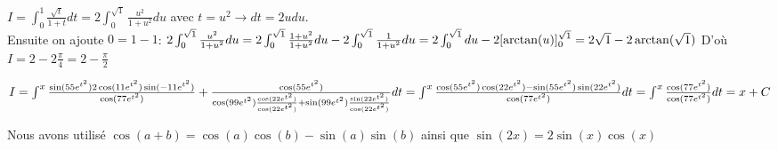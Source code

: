 \documentclass[11.5pt,french,table]{article}
\theoremstyle{exercice}
\newenvironment{packed_enum}{
\begin{enumerate}
  \setlength{\itemsep}{11pt}
  \setlength{\parskip}{0pt}
  \setlength{\parsep}{0pt}
}{\end{enumerate}}
\begin{document}
\begin{packed_enum}
    \item $
    I = \int_{0}^{1} \frac{\sqrt{t}}{1+t}dt = 2\int_{0}^{\sqrt{1}} \frac{u^2}{1+u^2}du
    $ avec $t = u^2 \rightarrow dt = 2udu$. \\Ensuite on ajoute $0 = 1 - 1$:
    $
    2\int_{0}^{\sqrt{1}} \frac{u^2}{1+u^2}du\\ = 2\int_{0}^{\sqrt{1}} \frac{1+u^2}{1+u^2}du - 2\int_{0}^{\sqrt{1}} \frac{1}{1+u^2} du \\= 2\int_{0}^{\sqrt{1}} du - 2[\arctan(u)]_{0}^{\sqrt{1}} \\= 2\sqrt{1}-2\arctan(\sqrt{1})\\
    $ D'où $I = 2 - 2\frac{\pi}{4} = 2 - \frac{\pi}{2}$ 

    \item $
    I = \int_{}^{x} \frac{\sin(55e^{t^{2}})2\cos(11e^{t^{2}})\sin(-11e^{t^{2}})}{\cos(77e^{t^{2}})} + \frac{\cos(55e^{t^{2}})}{\cos(99e^{t^2})\frac{\cos(22e^{t^2})}{\cos(22e^{t^2})}+\sin(99e^{t^2})\frac{\sin(22e^{t^2})}{\cos(22e^{t^2})}} dt\\
    = \int_{}^{x} \frac{\cos(55e^{t^{2}})\cos(22e^{t^{2}}) - \sin(55e^{t^{2}})\sin(22e^{t^{2}})}{\cos(77e^{t^{2}})} dt\\
    = \int^x \frac{\cos(77e^{t^{2}})}{\cos(77e^{t^{2}})}dt\\ 
    = x + C
    $
    
    Nous avons utilisé $\cos(a+b) = \cos(a)\cos(b) - \sin(a)\sin(b)$ ainsi que $\sin(2x) = 2\sin(x)\cos(x)$


\end{packed_enum}
\end{document}
